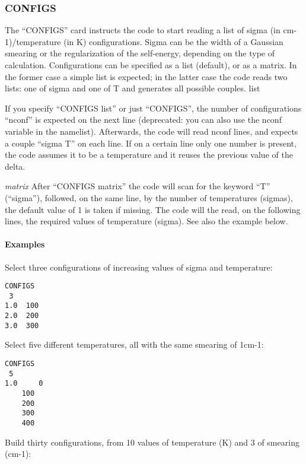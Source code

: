 \documentclass[
]{article}
\begin{document}
\hypertarget{configs}{%
\subsubsection{CONFIGS}\label{configs}}

The \enquote{CONFIGS} card instructs the code to start reading a list of
sigma (in cm-1)/temperature (in K) configurations. Sigma can be the
width of a Gaussian smearing or the regularization of the self-energy,
depending on the type of calculation. Configurations can be specified as
a list (default), or as a matrix. In the former case a simple list is
expected; in the latter case the code reads two lists: one of sigma and
one of T and generates all possible couples. list

If you specify \enquote{CONFIGS list} or just \enquote{CONFIGS}, the
number of configurations \enquote{nconf} is expected on the next line
(deprecated: you can also use the nconf variable in the namelist).
Afterwards, the code will read nconf lines, and expects a couple
\enquote{sigma T} on each line. If on a certain line only one number is
present, the code assumes it to be a temperature and it reuses the
previous value of the delta.

\emph{matrix} After \enquote{CONFIGS matrix} the code will scan for the
keyword \enquote{T} (\enquote{sigma}), followed, on the same line, by
the number of temperatures (sigmas), the default value of 1 is taken if
missing. The code will the read, on the following lines, the required
values of temperature (sigma). See also the example below.

\hypertarget{examples-1}{%
\paragraph{Examples}\label{examples-1}}

Select three configurations of increasing values of sigma and
temperature:

\begin{verbatim}
CONFIGS
 3
1.0  100
2.0  200
3.0  300
\end{verbatim}

Select five different temperatures, all with the same smearing of 1cm-1:

\begin{verbatim}
CONFIGS
 5
1.0     0
    100
    200
    300
    400
\end{verbatim}

Build thirty configurations, from 10 values of temperature (K) and 3 of
smearing (cm-1):
\end{document}
